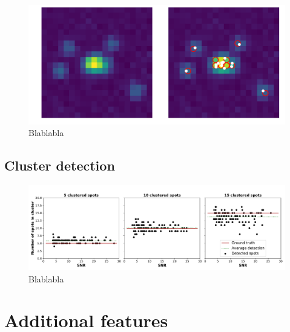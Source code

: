 \begin{figure}[h]
    \centering
    \includegraphics[width=1\textwidth]{figures/chapter2/plot_dense_decomposition}
    \caption{Blablabla}
    \label{fig:testD}
\end{figure}


\subsection{Cluster detection}


\begin{figure}[h]
    \centering
    \includegraphics[width=1\textwidth]{figures/chapter2/cluster_along_noise}
    \caption{Blablabla}
    \label{fig:cluster_results}
\end{figure}


\section{Additional features}

